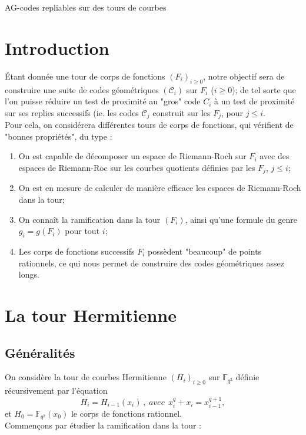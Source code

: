 \documentclass[10pt]{article}
\begin{document}
\begin{center}
\Huge{AG-codes repliables sur des tours de courbes}
\end{center}

\section{Introduction}

Étant donnée une tour de corps de fonctions $(F_i)_{i \geq 0}$, notre objectif sera de construire une suite de codes géométriques $(\mathcal{C}_i)$ sur $F_i$ ($i \geq 0$); de tel sorte que l'on puisse réduire un test de proximité au "gros" code $C_i$ à un test de proximité sur ses replies successifs (ie. les codes $\mathcal{C}_j$ construit sur les $F_j$, pour $j \leq i$. \\
Pour cela, on considérera différentes tours de corps de fonctions, qui vérifient de "bonnes propriétés", du type :
\begin{enumerate}
\item On est capable de décomposer un espace de Riemann-Roch sur $F_i$ avec des espaces de Riemann-Roc sur les courbes quotients définies par les $F_j$, $j \leq i$;
\item On est en mesure de calculer de manière efficace les espaces de Riemann-Roch dans la tour;
\item On connaît la ramification dans la tour $(F_i)$, ainsi qu'une formule du genre $g_i = g(F_i)$ pour tout $i$;
\item Les corps de fonctions successifs $F_i$ possèdent "beaucoup" de points rationnels, ce qui nous permet de construire des codes géométriques assez longs.
\end{enumerate}

\section{La tour Hermitienne}

\subsection{Généralités}

On considère la tour de courbes Hermitienne $(H_i)_{i\geq 0}$ sur $\mathbb{F}_{q^2}$ définie récursivement par l'équation
\[ H_i = H_{i-1}(x_i) \ , \ avec \ \  x_i^q+x_{i} = x_{i-1}^{q+1},\]
et $H_0=\mathbb{F}_{q^2}(x_0)$ le corps de fonctions rationnel. \\
Commençons par étudier la ramification dans la tour :
\end{document}
